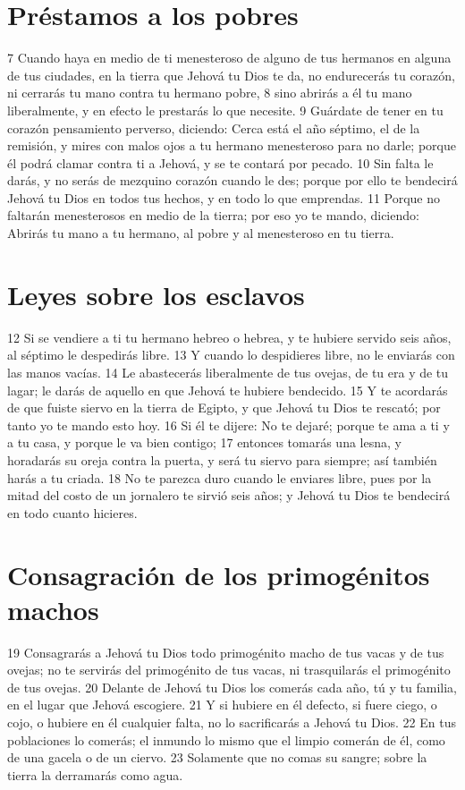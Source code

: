 \section{Préstamos a los pobres}

7 Cuando haya en medio de ti menesteroso de alguno de tus hermanos en alguna de tus ciudades, en la tierra que Jehová tu Dios te da, no endurecerás tu corazón, ni cerrarás tu mano contra tu hermano pobre,
8 sino abrirás a él tu mano liberalmente, y en efecto le prestarás lo que necesite.
9 Guárdate de tener en tu corazón pensamiento perverso, diciendo: Cerca está el año séptimo, el de la remisión, y mires con malos ojos a tu hermano menesteroso para no darle; porque él podrá clamar contra ti a Jehová, y se te contará por pecado.
10 Sin falta le darás, y no serás de mezquino corazón cuando le des; porque por ello te bendecirá Jehová tu Dios en todos tus hechos, y en todo lo que emprendas.
11 Porque no faltarán menesterosos en medio de la tierra; por eso yo te mando, diciendo: Abrirás tu mano a tu hermano, al pobre y al menesteroso en tu tierra.

\section{Leyes sobre los esclavos }

12 Si se vendiere a ti tu hermano hebreo o hebrea, y te hubiere servido seis años, al séptimo le despedirás libre.
13 Y cuando lo despidieres libre, no le enviarás con las manos vacías.
14 Le abastecerás liberalmente de tus ovejas, de tu era y de tu lagar; le darás de aquello en que Jehová te hubiere bendecido.
15 Y te acordarás de que fuiste siervo en la tierra de Egipto, y que Jehová tu Dios te rescató; por tanto yo te mando esto hoy.
16 Si él te dijere: No te dejaré; porque te ama a ti y a tu casa, y porque le va bien contigo;
17 entonces tomarás una lesna, y horadarás su oreja contra la puerta, y será tu siervo para siempre; así también harás a tu criada.
18 No te parezca duro cuando le enviares libre, pues por la mitad del costo de un jornalero te sirvió seis años; y Jehová tu Dios te bendecirá en todo cuanto hicieres. 

\section{Consagración de los primogénitos machos}

19 Consagrarás a Jehová tu Dios todo primogénito macho de tus vacas y de tus ovejas; no te servirás del primogénito de tus vacas, ni trasquilarás el primogénito de tus ovejas.
20 Delante de Jehová tu Dios los comerás cada año, tú y tu familia, en el lugar que Jehová escogiere.
21 Y si hubiere en él defecto, si fuere ciego, o cojo, o hubiere en él cualquier falta, no lo sacrificarás a Jehová tu Dios.
22 En tus poblaciones lo comerás; el inmundo lo mismo que el limpio comerán de él, como de una gacela o de un ciervo.
23 Solamente que no comas su sangre; sobre la tierra la derramarás como agua.

